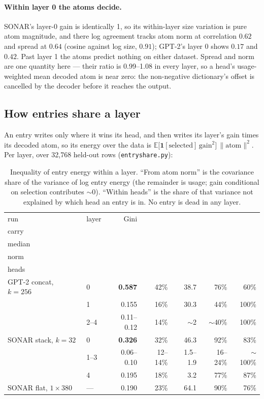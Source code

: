 \paragraph{Within layer 0 the atoms decide.} SONAR's layer-0 gain is
identically 1, so its within-layer size variation is pure atom
magnitude, and there log agreement tracks atom norm at correlation $0.62$
and spread at $0.64$ (cosine against log size, $0.91$); GPT-2's layer 0 shows
$0.17$ and $0.42$. Past layer 1 the atoms predict nothing on either
dataset. Spread and norm are one quantity here --- their ratio is
0.99--1.08 in every layer, so a head's usage-weighted mean decoded atom
is near zero: the non-negative dictionary's offset is cancelled by the
decoder before it reaches the output.

\subsection{How entries share a layer}
\label{sec:entries}

An entry writes only where it wins its head, and then writes its layer's
gain times its decoded atom, so its energy over the data is
$\mathbb{E}\big[\mathbf{1}[\text{selected}]\,\mathrm{gain}^2\big]\,
\lVert\text{atom}\rVert^2$. Per layer, over 32{,}768 held-out rows
(\texttt{entryshare.py}):

\begin{table}[htbp]\centering\small
\begin{tabular}{@{}llrrrrr@{}}
\toprule
run & layer & Gini & \stackhead[r]{top 10\%\\carry} & \stackhead[r]{max/\\median}
& \stackhead[r]{from atom\\norm} & \stackhead[r]{within\\heads} \\
\midrule
GPT-2 concat, $k{=}256$ & 0 & \textbf{0.587} & 42\% & 38.7 & 76\% & 60\% \\
& 1 & 0.155 & 16\% & 30.3 & 44\% & 100\% \\
& 2--4 & 0.11--0.12 & 14\% & $\sim$2 & $\sim$40\% & 100\% \\
SONAR stack, $k{=}32$ & 0 & \textbf{0.326} & 32\% & 46.3 & 92\% & 83\% \\
& 1--3 & 0.06--0.10 & 12--14\% & 1.5--1.9 & 16--24\% & $\sim$100\% \\
& 4 & 0.195 & 18\% & 3.2 & 77\% & 87\% \\
SONAR flat, $1\times380$ & --- & 0.190 & 23\% & 64.1 & 90\% & 76\% \\
\bottomrule
\end{tabular}
\caption{Inequality of entry energy within a layer. ``From atom norm'' is
the covariance share of the variance of log entry energy (the remainder
is usage; gain conditional on selection contributes $\sim$0). ``Within
heads'' is the share of that variance not explained by which head an
entry is in. No entry is dead in any layer.}
\label{tab:entries}
\end{table}

